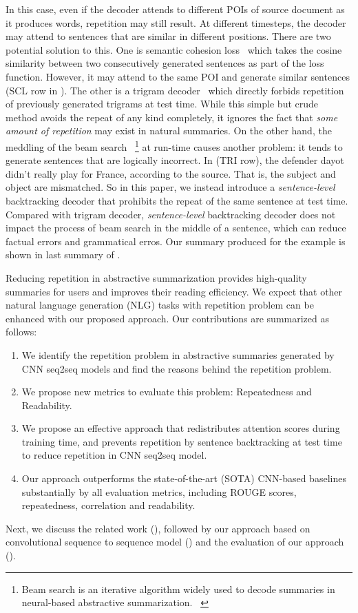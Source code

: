 In this case, even if the decoder attends to different POIs of 
source document as it produces words, repetition may still result.  
At different timesteps,
the decoder may attend 
to sentences that are similar in different positions.
There are two potential solution to this.
One is semantic cohesion loss~\cite{elikyilmazBHC18}
which takes the cosine similarity between two consecutively generated sentences
as part of the loss function. However, it may attend to the same POI
and generate similar sentences (SCL row in ).  
The other is a trigram decoder~\cite{PaulusXS17} 
which directly forbids repetition of previously generated trigrams at test time. 
While this simple but crude method avoids the repeat of any kind
completely, 
it ignores the fact that \textit{some amount of repetition} may exist
in natural summaries.  
On the other hand, the meddling of the beam search
~\footnote{Beam search is an iterative algorithm widely used to decode
summaries in neural-based abstractive summarization.
~\cite{beamsearch}}
at run-time causes another problem: 
it tends to generate sentences that are logically incorrect. 
In  (TRI row), the defender dayot didn't
really play for France, according to the source.
That is, the subject and object are mismatched.
So in this paper, we instead introduce a {\em sentence-level} backtracking decoder
that prohibits the repeat of the same sentence at test time.
Compared with trigram decoder, {\em sentence-level} backtracking decoder
does not impact
the process of beam search in the middle of a sentence, 
which can reduce factual errors and grammatical erros.
Our summary produced for the example is shown in last summary of 
.

Reducing repetition in abstractive summarization provides high-quality summaries for users and improves their reading efficiency.
We expect that other natural language generation (NLG) tasks with repetition problem can be enhanced with our proposed approach. 
Our contributions are summarized as follows:
\begin{enumerate}
\item We identify the repetition problem in abstractive summaries generated
by CNN seq2seq models and find the reasons behind the repetition problem.
\item We propose new metrics to evaluate this problem: Repeatedness and Readability.
\item We propose an effective approach that redistributes attention scores 
during training time, and prevents repetition by sentence backtracking
at test time to reduce repetition in CNN seq2seq model.
\item Our approach
outperforms the state-of-the-art (SOTA) CNN-based baselines 
substantially by all evaluation metrics, including ROUGE scores, 
repeatedness, correlation and readability.
\end{enumerate}

Next, we discuss the related work (),
followed by 
our approach based on convolutional sequence to sequence 
model ()
and the evaluation of our approach ().
